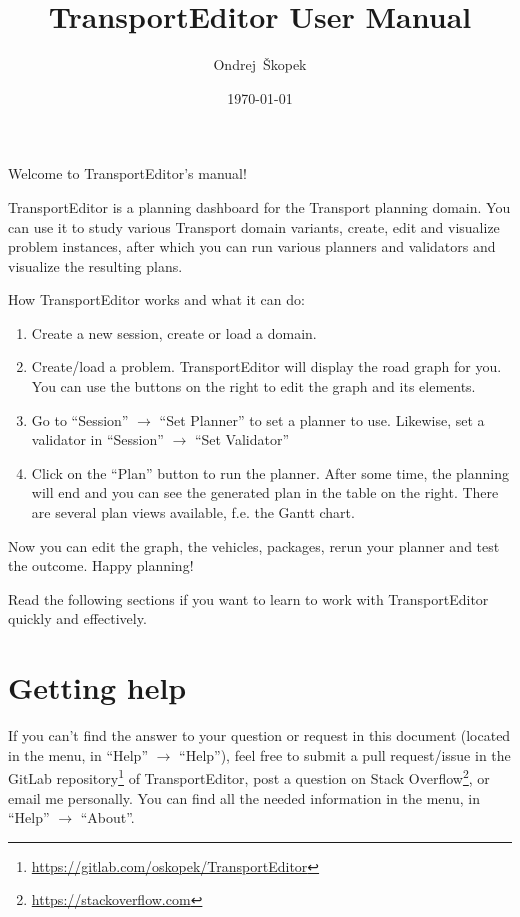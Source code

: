 \documentclass[12pt,a4paper,twoside]{article}
\title{TransportEditor User Manual}
\author{Ondrej~{\v{S}}kopek}
\date{\today}
\begin{document}
\maketitle

Welcome to TransportEditor's manual!

TransportEditor is a planning dashboard for the Transport planning domain.
You can use it to study various Transport domain variants,
create, edit and visualize problem instances, after which you can
run various planners and validators and visualize the resulting plans.

How TransportEditor works and what it can do:

\begin{enumerate}
\item Create a new session, create or load a domain.

\item Create/load a problem. TransportEditor will display the road graph for you.
You can use the buttons on the right to edit the graph and its elements.

\item Go to ``Session'' $\to$ ``Set Planner'' to set a planner to use. Likewise, set a validator in
``Session'' $\to$ ``Set Validator''

\item{Click on the ``Plan'' button to run the planner. After some time, the planning will end and you can
see the generated plan in the table on the right. There are several plan views available, f.e. the Gantt chart.}
\end{enumerate}

Now you can edit the graph, the vehicles, packages, rerun your planner and test the outcome. Happy planning!

Read the following sections if you want to learn to work with TransportEditor quickly and effectively.

\section{Getting help}
If you can't find the answer to your question or request in this document
(located in the menu, in ``Help'' $\to$ ``Help''),
feel free to submit a pull request/issue in
the GitLab repository\footnote{\url{https://gitlab.com/oskopek/TransportEditor}} of TransportEditor,
post a question on Stack Overflow\footnote{\url{https://stackoverflow.com}}, or email me personally.
You can find all the needed information in the menu, in ``Help'' $\to$ ``About''.
\end{document}
